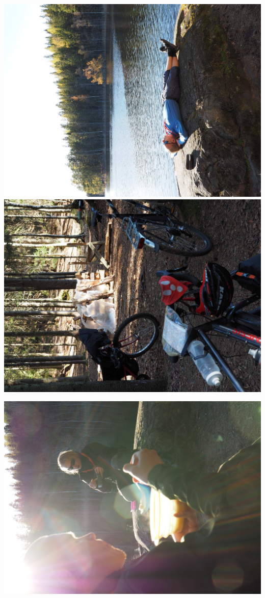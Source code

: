 \begin{multicols}{2}
	\begin{center}
		\noindent\includegraphics[width=1.05\linewidth]{assets/pyörävaellus24}
		\noindent\includegraphics[width=1.05\linewidth]{assets/pyörävaellus22}
	\end{center}
	\columnbreak
	\begin{center}
		\noindent\includegraphics[width=1.05\linewidth]{assets/pyörävaellus23}

\end{center}
\end{multicols}
